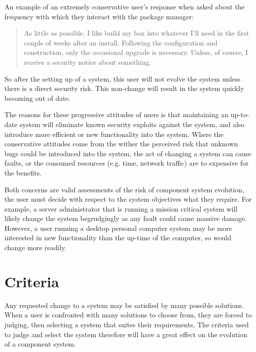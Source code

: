 An example of an extremely conservative user's response when asked about the frequency with which they interact with the package manager:
\begin{quotation}
As little as possible. I like build my box into whatever I'll need in the first couple of weeks after an install. 
Following the configuration and construction, only the occasional upgrade is necessary. 
Unless, of course, I receive a security notice about something.
\end{quotation}
So after the setting up of a system, this user will not evolve the system unless there is a direct security risk.
This non-change will result in the system quickly becoming out of date.

The reasons for these progressive attitudes of users is that maintaining an up-to-date system will eliminate known security exploits against the system,
and also introduce more efficient or new functionality into the system.
Where the conservative attitudes come from the wither the perceived risk that unknown bugs could be introduced into the system, the act of changing a system can cause faults,
or the consumed resources (e.g. time, network traffic) are to expensive for the benefits.

Both concerns are valid assessments of the risk of component system evolution, the user must decide with respect to the system objectives what they require. 
For example, a server administrator that is running a mission critical system will likely change the system begrudgingly as any fault could cause massive damage.
However, a user running a desktop personal computer system may be more interested in new functionality than the up-time of the computer, so would change more readily.

\section{Criteria}
Any requested change to a system may be satisfied by many possible solutions.
When a user is confronted with many solutions to choose from, they are forced to judging, then selecting a system that suites their requirements.
The criteria used to judge and select the system therefore will have a great effect on the evolution of a component system.

